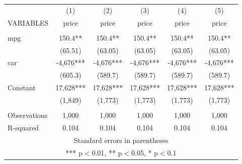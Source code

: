 \documentclass[]{article}
\begin{document}
\begin{tabular}{lccccc} \hline
 & (1) & (2) & (3) & (4) & (5) \\
VARIABLES & price & price & price & price & price \\ \hline
 &  &  &  &  &  \\
mpg & 150.4** & 150.4** & 150.4** & 150.4** & 150.4** \\
 & (65.51) & (63.05) & (63.05) & (63.05) & (63.05) \\
car & -4,676*** & -4,676*** & -4,676*** & -4,676*** & -4,676*** \\
 & (605.3) & (589.7) & (589.7) & (589.7) & (589.7) \\
Constant & 17,628*** & 17,628*** & 17,628*** & 17,628*** & 17,628*** \\
 & (1,849) & (1,773) & (1,773) & (1,773) & (1,773) \\
 &  &  &  &  &  \\
Observations & 1,000 & 1,000 & 1,000 & 1,000 & 1,000 \\
 R-squared & 0.104 & 0.104 & 0.104 & 0.104 & 0.104 \\ \hline
\multicolumn{6}{c}{ Standard errors in parentheses} \\
\multicolumn{6}{c}{ *** p$<$0.01, ** p$<$0.05, * p$<$0.1} \\
\end{tabular}
\end{document}
